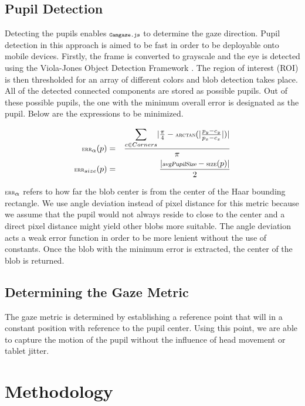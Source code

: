 \documentclass[annual]{acmsiggraph}
\newcommand{\Acronym}[1]{\ensuremath{{\small{\texttt{#1}}}}}
\newcommand{\Name}{\Acronym{Camgaze.js}}
\newcommand{\Function}[1]{\ensuremath{{\small \textsc{#1}}}}
\newcommand{\Var}[1]{\ensuremath{{\small{\textsl{#1}}}}}
\begin{document}
\subsection{Pupil Detection}

Detecting the pupils enables $\Name$ to determine the gaze direction.
Pupil detection in this approach is aimed to be fast in order to 
be deployable onto mobile devices. Firstly, the frame is converted to 
grayscale and the eye is detected using the Viola-Jones Object
Detection Framework \cite{Viola01}. The region of interest (ROI) is
then thresholded for an array of different colors and blob detection
takes place. All of the detected connected components are stored as 
possible pupils. Out of these possible pupils, the one with the 
minimum overall error is designated as the pupil. Below are the 
expressions to be minimized.

\begin{eqnarray}
\Function{err}_{\alpha}(p) &=& \frac{
    \mathlarger{\sum}_{c \in Corners}{
        \vert 
            \frac{\pi}{4} - \Function{arctan}(
                \vert \frac{p_y - c_y}{p_x - c_x} \vert
            ) 
        \vert
    }
}{\pi} \\
\Function{err}_{size}(p) &=& \frac{
     \vert
        \Var{avgPupilSize} - \Function{size}(p)
    \vert
}{2}
\end{eqnarray}

$\Function{err}_{\alpha}$ refers to how far the blob center is from the
center of the Haar bounding rectangle. We use angle deviation instead
of pixel distance for this metric because we assume that the pupil would
not always reside to close to the center and a direct pixel distance
might yield other blobs more suitable. The angle deviation acts a weak
error function in order to be more lenient without the use of constants.
Once the blob with the minimum error is extracted, the center of the blob
is returned.

\subsection{Determining the Gaze Metric}

The gaze metric is determined by establishing a reference point that will
in a constant position with reference to the pupil center. Using this point,
we are able to capture the motion of the pupil without the influence of
head movement or tablet jitter.

\section{Methodology}
\end{document}

